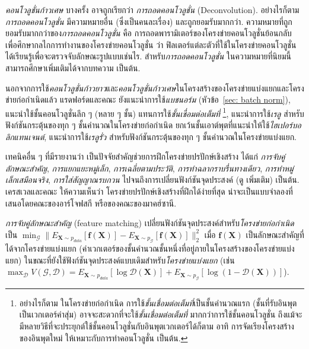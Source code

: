 \textit{คอนโวลูชั่นก้าวเศษ} บางครั้ง อาจถูกเรียกว่า \textit{การถอดคอนโวลูชั่น} (Deconvolution).
อย่างไรก็ตาม 
\textit{การถอดคอนโวลูชั่น} มีความหมายอื่น (ซึ่งเป็นคนละเรื่อง)
และถูกยอมรับมากกว่า.
ความหมายที่ถูกยอมรับมากกว่าของ\textit{การถอดคอนโวลูชั่น}
คือ การถอดพารามิเตอร์ของโครงข่ายคอนโวลูชั่นย้อนกลับ 
เพื่อศึกษากลไกการทำงานของโครงข่ายคอนโวลูชั่น ว่า
ฟิลเตอร์แต่ละตัวที่ใช้ในโครงข่ายคอนโวลูชั่น 
ได้เรียนรู้เพื่อจะตรวจจับลักษณะรูปแบบเช่นไร.
สำหรับ\textit{การถอดคอนโวลูชั่น} ในความหมายที่นิยมนี้
สามารถศึกษาเพิ่มเติมได้จากบทความ \cite{ZeilerFergus2014, ZeilerEtAl2010, SpringenbergEtAl2015} เป็นต้น.

นอกจากการใช้\textit{คอนโวลูชั่นก้าวยาว}และ\textit{คอนโวลูชั่นก้าวเศษ}ในโครงสร้างของโครงข่ายแบ่งแยกและโครงข่ายก่อกำเนิดแล้ว
แรดฟอร์ดและคณะ\cite{DCGAN} ยังแนะนำการใช้\textit{แบชนอร์ม} (หัวข้อ~\ref{sec: batch norm}),
แนะนำใช้ชั้นคอนโวลูชั่นลึก ๆ (หลาย ๆ ชั้น) แทนการใช้\textit{ชั้นเชื่อมต่อเต็มที่}%
\footnote{%
อย่างไรก็ตาม 
ในโครงข่ายก่อกำเนิด
การใช้\textit{ชั้นเชื่อมต่อเต็มที่}เป็นชั้นคำนวณแรก (ชั้นที่รับอินพุตเป็นเวกเตอร์ค่าสุ่ม) 
อาจจะสะดวกที่จะใช้\textit{ชั้นเชื่อมต่อเต็มที่} มากกว่าการใช้ชั้นคอนโวลูชั่น
ถึงแม้จะมีหลายวิธีที่จะประยุกต์ใช้ชั้นคอนโวลูชั่นกับอินพุตเวกเตอร์ได้ก็ตาม อาทิ การจัดเรียงโครงสร้างของอินพุตใหม่ ให้เหมาะกับการทำคอนโวลูชั่น เป็นต้น.
},
แนะนำการใช้\textit{เรลู}
สำหรับฟังก์ชันกระตุ้นของทุก ๆ ชั้นคำนวณในโครงข่ายก่อกำเนิด ยกเว้นชั้นเอาต์พุตที่แนะนำให้ใช้\textit{ไฮเปอร์บอลิกแทนเจนต์},
แนะนำการใช้\textit{เรลูรั่ว}
สำหรับฟังก์ชันกระตุ้นของทุก ๆ ชั้นคำนวณในโครงข่ายแบ่งแยก.

เทคนิคอื่น ๆ ที่มีรายงานว่า เป็นปัจจัยสำคัญช่วยการฝึกโครงข่ายปรปักษ์เชิงสร้าง
ได้แก่ \textit{การจับคู่ลักษณะสำคัญ}\cite{SalimansEtAl2016},
\textit{การแยกแยะหมู่เล็ก}\cite{SalimansEtAl2016},
\textit{การเฉลี่ยตามประวัติ}\cite{SalimansEtAl2016},
\textit{การทำฉลากราบรื่นทางเดียว}\cite{SalimansEtAl2016},
\textit{การทำหมู่เล็กเสมือนจริง}\cite{SalimansEtAl2016},
\textit{การใส่สัญญาณรบกวน}\cite{SonderbyEtAl, ArjovskyEtAl2016}
ไปจนถึงการเปลี่ยนฟังก์ชันจุดประสงค์ (ดู \cite{NowozinEtAl2016, WGAN} เพิ่มเติม) เป็นต้น.
เครสเวลและคณะ\cite{OverviewGAN2018} ให้ความเห็นว่า 
โครงข่ายปรปักษ์เชิงสร้างที่ฝึกได้ง่ายที่สุด น่าจะเป็นแบบจำลองที่เสนอโดยคณะของอาร์โจฟสกี\cite{WGAN}
หรือของคณะของมาคฮ์ซานี\cite{AAE}.

\textit{การจับคู่ลักษณะสำคัญ} (feature matching)%
เปลี่ยนฟังก์ชันจุดประสงค์สำหรับ\textit{โครงข่ายก่อกำเนิด}
เป็น $\min_{\mathcal{G}} \| E_{\bm{X} \sim p_{data}}[\bm{f}(\bm{X})] - E_{\bm{X} \sim p_{\mathcal{G}}}[\bm{f}(\bm{X})] \|^2_2$
เมื่อ $\bm{f}(\bm{X})$ เป็นลักษณะสำคัญที่ได้จากโครงข่ายแบ่งแยก 
(ค่าเวกเตอร์ของชั้นคำนวณชั้นหนึ่งที่อยู่ภายในโครงสร้างของโครงข่ายแบ่งแยก)
ในขณะที่ยังใช้ฟังก์ชันจุดประสงค์แบบเดิมสำหรับ\textit{โครงข่ายแบ่งแยก} (เช่น $\max_{\mathcal{D}} V(\mathcal{G}, \mathcal{D})
= E_{\bm{X} \sim p_{data}}[\log \mathcal{D}(\bm{X})] 
+ E_{\bm{X} \sim p_{\mathcal{G}}}[\log(1 - \mathcal{D}(\bm{X}))]$).


